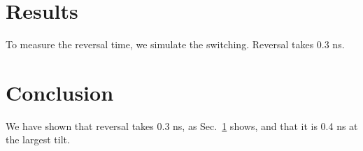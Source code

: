 \documentclass{article}
\begin{document}
\begin{abstract}
Here we show that reversal takes 0.3 ns.
\end{abstract}

\section{Results}
\label{sec:results}
To measure the reversal time, we simulate the switching. Reversal takes 0.3 ns.

\section{Conclusion}
We have shown that reversal takes 0.3 ns, as Sec.~\ref{sec:results} shows, and that it is 0.4 ns at the largest tilt.
\end{document}
